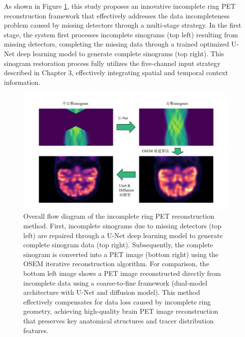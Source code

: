 \documentclass[
reprint,
superscriptaddress,
nofootinbib,
amsmath,amssymb,
aps,
prd,
]{revtex4-2}
\begin{document}
As shown in Figure \ref{fig:reconstruction_workflow}, this study proposes an innovative incomplete ring PET reconstruction framework that effectively addresses the data incompleteness problem caused by missing detectors through a multi-stage strategy. In the first stage, the system first processes incomplete sinograms (top left) resulting from missing detectors, completing the missing data through a trained optimized U-Net deep learning model to generate complete sinograms (top right). This sinogram restoration process fully utilizes the five-channel input strategy described in Chapter 3, effectively integrating spatial and temporal context information.

\begin{figure}[ht]
    \centering
    \includegraphics[width=\textwidth]{Images/reconstruction_workflow}
    \vspace{-.5cm}
    \caption{Overall flow diagram of the incomplete ring PET reconstruction method. First, incomplete sinograms due to missing detectors (top left) are repaired through a U-Net deep learning model to generate complete sinogram data (top right). Subsequently, the complete sinogram is converted into a PET image (bottom right) using the OSEM iterative reconstruction algorithm. For comparison, the bottom left image shows a PET image reconstructed directly from incomplete data using a coarse-to-fine framework (dual-model architecture with U-Net and diffusion model). This method effectively compensates for data loss caused by incomplete ring geometry, achieving high-quality brain PET image reconstruction that preserves key anatomical structures and tracer distribution features.}
    \vspace{-.2cm}
    \label{fig:reconstruction_workflow}
\end{figure}
\end{document}
